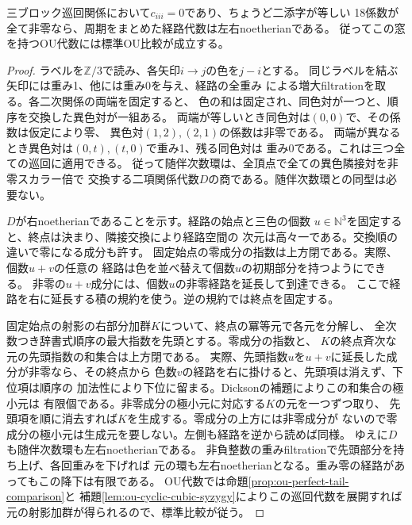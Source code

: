 \begin{lemma}[対角三零に対する色の交換]
\label{lem:ou-matching-noetherian}
三ブロック巡回関係において$c_{iii}=0$であり、ちょうど二添字が等しい
18係数が全て非零なら、周期をまとめた経路代数は左右noetherianである。
従ってこの窓を持つOU代数には標準OU比較が成立する。
\end{lemma}
\begin{proof}
ラベルを$\mathbb Z/3$で読み、各矢印$i\to j$の色を$j-i$とする。
同じラベルを結ぶ矢印には重み1、他には重み0を与え、経路の全重み
による増大filtrationを取る。各二次関係の両端を固定すると、
色の和は固定され、同色対が一つと、順序を交換した異色対が一組ある。
両端が等しいとき同色対は$(0,0)$で、その係数は仮定により零、
異色対$(1,2),(2,1)$の係数は非零である。
両端が異なるとき異色対は$(0,t),(t,0)$で重み1、残る同色対は
重み0である。これは三つ全ての巡回に適用できる。
従って随伴次数環は、全頂点で全ての異色隣接対を非零スカラー倍で
交換する二項関係代数$D$の商である。随伴次数環との同型は必要ない。

$D$が右noetherianであることを示す。経路の始点と三色の個数
$u\in\mathbb N^3$を固定すると、終点は決まり、隣接交換により経路空間の
次元は高々一である。交換順の違いで零になる成分も許す。
固定始点の零成分の指数は上方閉である。実際、個数$u+v$の任意の
経路は色を並べ替えて個数$u$の初期部分を持つようにできる。
非零の$u+v$成分には、個数$u$の非零経路を延長して到達できる。
ここで経路を右に延長する積の規約を使う。逆の規約では終点を固定する。

固定始点の射影の右部分加群$K$について、終点の冪等元で各元を分解し、
全次数つき辞書式順序の最大指数を先頭とする。零成分の指数と、
$K$の終点斉次な元の先頭指数の和集合は上方閉である。
実際、先頭指数$u$を$u+v$に延長した成分が非零なら、その終点から
色数$v$の経路を右に掛けると、先頭項は消えず、下位項は順序の
加法性により下位に留まる。Dicksonの補題によりこの和集合の極小元は
有限個である。非零成分の極小元に対応する$K$の元を一つずつ取り、
先頭項を順に消去すれば$K$を生成する。零成分の上方には非零成分が
ないので零成分の極小元は生成元を要しない。左側も経路を逆から読めば同様。
ゆえに$D$も随伴次数環も左右noetherianである。
非負整数の重みfiltrationで先頭部分を持ち上げ、各回重みを下げれば
元の環も左右noetherianとなる。重み零の経路があってもこの降下は有限である。
OU代数では命題\ref{prop:ou-perfect-tail-comparison}と
補題\ref{lem:ou-cyclic-cubic-syzygy}によりこの巡回代数を展開すれば
元の射影加群が得られるので、標準比較が従う。
\end{proof}

